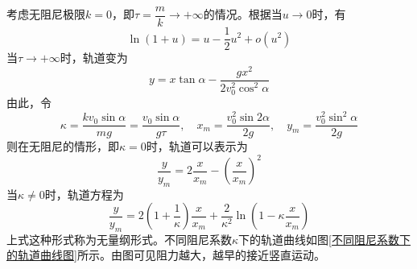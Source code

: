\begin{solution}
考虑无阻尼极限$k=0$，即$\tau = \dfrac{m}{k} \to +\infty$的情况。根据当$u \to 0$时，有
\begin{equation*}
	\ln (1+u) = u - \frac12 u^2 + o(u^2)
\end{equation*}
当$\tau \to +\infty$时，轨道变为
\begin{equation*}
	y = x\tan \alpha -\frac{gx^2}{2v_0^2\cos^2 \alpha}
\end{equation*}
由此，令
\begin{equation*}
	\kappa = \frac{kv_0 \sin \alpha}{mg} = \frac{v_0 \sin \alpha}{g\tau},\quad x_m = \frac{v_0^2 \sin 2\alpha}{2g},\quad y_m = \frac{v_0^2 \sin^2 \alpha}{2g}
\end{equation*}
则在无阻尼的情形，即$\kappa=0$时，轨道可以表示为
\begin{equation*}
	\frac{y}{y_m} = 2\frac{x}{x_m} - \left(\frac{x}{x_m}\right)^2
\end{equation*}
当$\kappa \neq 0$时，轨道方程为
\begin{equation*}
	\frac{y}{y_m} = 2\left(1+\frac{1}{\kappa}\right) \frac{x}{x_m} + \frac{2}{\kappa^2} \ln \left(1-\kappa \frac{x}{x_m}\right)
\end{equation*}
上式这种形式称为{\heiti 无量纲形式}。不同阻尼系数$\kappa$下的轨道曲线如图\ref{不同阻尼系数下的轨道曲线图}所示。由图可见阻力越大，越早的接近竖直运动。
\end{solution}

